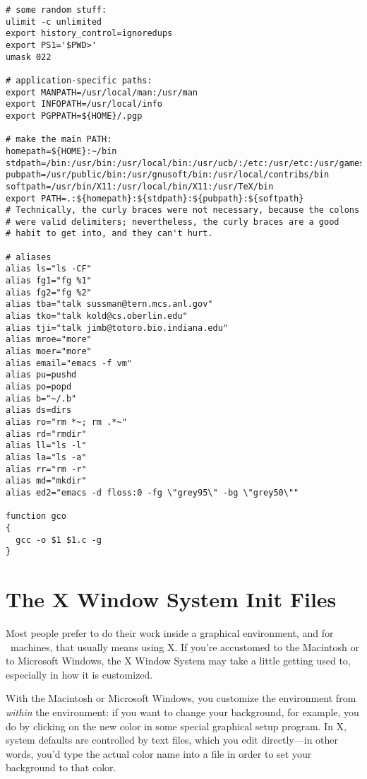 \begin{screen}\begin{verbatim}
# some random stuff:
ulimit -c unlimited
export history_control=ignoredups
export PS1='$PWD>'
umask 022

# application-specific paths:
export MANPATH=/usr/local/man:/usr/man
export INFOPATH=/usr/local/info
export PGPPATH=${HOME}/.pgp

# make the main PATH:
homepath=${HOME}:~/bin
stdpath=/bin:/usr/bin:/usr/local/bin:/usr/ucb/:/etc:/usr/etc:/usr/games
pubpath=/usr/public/bin:/usr/gnusoft/bin:/usr/local/contribs/bin
softpath=/usr/bin/X11:/usr/local/bin/X11:/usr/TeX/bin
export PATH=.:${homepath}:${stdpath}:${pubpath}:${softpath}
# Technically, the curly braces were not necessary, because the colons
# were valid delimiters; nevertheless, the curly braces are a good
# habit to get into, and they can't hurt.

# aliases
alias ls="ls -CF"
alias fg1="fg %1"
alias fg2="fg %2"
alias tba="talk sussman@tern.mcs.anl.gov"
alias tko="talk kold@cs.oberlin.edu"
alias tji="talk jimb@totoro.bio.indiana.edu"
alias mroe="more"
alias moer="more"
alias email="emacs -f vm"
alias pu=pushd
alias po=popd
alias b="~/.b"
alias ds=dirs
alias ro="rm *~; rm .*~"
alias rd="rmdir"
alias ll="ls -l"
alias la="ls -a"
alias rr="rm -r"
alias md="mkdir"
alias ed2="emacs -d floss:0 -fg \"grey95\" -bg \"grey50\""

function gco
{
  gcc -o $1 $1.c -g
}
\end{verbatim}\end{screen}



\section{The X Window System Init Files}

\xwarn Most people prefer to do their work inside a graphical
environment, and for \unix\ machines, that usually means using X.  If
you're accustomed to the Macintosh or to Microsoft
Windows, the X Window System may take a
little getting used to, especially in how it is customized.

With the Macintosh or Microsoft Windows, you customize the environment
from {\em within} the environment: if you want to change your
background, for example, you do by clicking on the new color in some
special graphical setup program.  In X, system defaults are controlled
by text files, which you edit directly---in other words, you'd type
the actual color name into a file in order to set your background to
that color.

